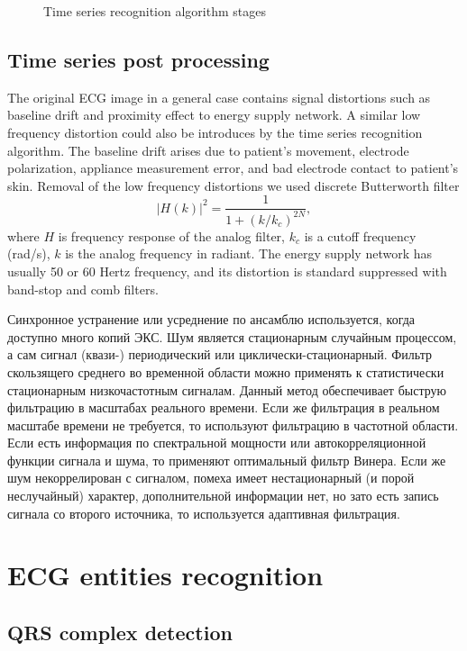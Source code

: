 \documentclass[runningheads]{AIIT}
\begin{document}
\begin{figure}[htb]
  \centering

  \caption{Time series recognition algorithm stages}
  \label{fig:leads-ex}
\end{figure}

\subsection{Time series post processing}
\label{sec:cleaning-artefacts}

The original ECG image in a general case contains signal distortions such as baseline drift and proximity effect to energy supply network.  A similar low frequency distortion could also be introduces by the time series recognition algorithm.  The baseline drift arises due to patient's movement, electrode polarization, appliance measurement error, and bad electrode contact to patient's skin.  Removal of the low frequency distortions we used discrete Butterworth filter
$$
|H(k)|^2=\frac{1}{1+(k/k_c)^{2N}},
$$
where $H$ is frequency response of the analog filter, $k_c$ is a cutoff frequency (rad/s), $k$ is the analog frequency in radiant.  The energy supply network has usually 50 or 60 Hertz frequency, and its distortion is standard suppressed with band-stop and comb filters.

Синхронное устранение или усреднение по ансамблю используется, когда доступно много копий ЭКС. Шум является стационарным случайным процессом, а сам сигнал (квази-) периодический или циклически-стационарный. Фильтр скользящего среднего во временной области можно применять к статистически стационарным низкочастотным сигналам. Данный метод обеспечивает быструю фильтрацию в масштабах реального времени. Если же фильтрация в реальном масштабе времени не требуется, то используют фильтрацию в частотной области. Если есть информация по спектральной мощности или автокорреляционной функции сигнала и шума, то применяют оптимальный фильтр Винера. Если же шум некоррелирован с сигналом, помеха имеет нестационарный (и порой неслучайный) характер, дополнительной информации нет, но зато есть запись сигнала со второго источника, то используется адаптивная фильтрация.

\section{ECG entities recognition}
\label{sec:ecg-etit-recogn}

\subsection{QRS complex detection}
\label{sec:qrs-compl-detect}
\end{document}
